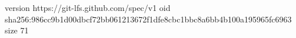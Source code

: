 version https://git-lfs.github.com/spec/v1
oid sha256:986cc9b1d00dbcf72bb061213672f1dfe8cbc1bbc8a6bb4b100a195965fc6963
size 71
